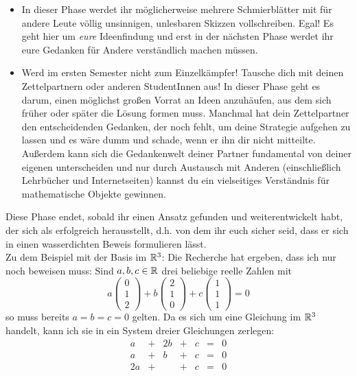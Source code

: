 \begin{de}
\begin{itemize}
        \item In dieser Phase werdet ihr möglicherweise mehrere Schmierblätter mit für andere Leute völlig unsinnigen, unlesbaren Skizzen vollschreiben. Egal! Es geht hier um \emph{eure} Ideenfindung und erst in der nächsten Phase werdet ihr eure Gedanken für Andere verständlich machen müssen.
        \item Werd im ersten Semester nicht zum Einzelkämpfer! Tausche dich mit deinen Zettelpartnern oder anderen StudentInnen aus! In dieser Phase geht es darum, einen möglichst großen Vorrat an Ideen anzuhäufen, aus dem sich früher oder später die Lösung formen muss. Manchmal hat dein Zettelpartner den entscheidenden Gedanken, der noch fehlt, um deine Strategie aufgehen zu lassen und es wäre dumm und schade, wenn er ihn dir nicht mitteilte. Außerdem kann sich die Gedankenwelt deiner Partner fundamental von deiner eigenen unterscheiden und nur durch Austausch mit Anderen (einschließlich Lehrbücher und Internetseiten) kannst du ein vielseitiges Verständnis für mathematische Objekte gewinnen.
    \end{itemize}
    Diese Phase endet, sobald ihr einen Ansatz gefunden und weiterentwickelt habt, der sich als erfolgreich herausstellt, d.h. von dem ihr euch sicher seid, dass er sich in einen wasserdichten Beweis formulieren lässt. \\[0.5em]
    Zu dem Beispiel mit der Basis im $\mathbb R^3$: Die Recherche hat ergeben, dass ich nur noch beweisen muss: Sind $a,b,c\in \mathbb R$ drei beliebige reelle Zahlen mit
        \[ a\begin{pmatrix} 0 \\ 1 \\ 2 \end{pmatrix} + b \begin{pmatrix} 2 \\ 1 \\ 0 \end{pmatrix}+c \begin{pmatrix} 1 \\ 1 \\ 1 \end{pmatrix} = 0  \]
    so muss bereits $a=b=c=0$ gelten. Da es sich um eine Gleichung im $\mathbb R^3$ handelt, kann ich sie in ein System dreier Gleichungen zerlegen:
    \[\begin{array}{ccccccc}
        a &+& 2b &+& c &=& 0 \\
        a &+& b &+& c & =& 0 \\
        2a &+& &+ &c & =& 0
    \end{array}\]

\end{de}
